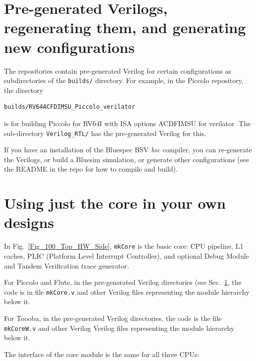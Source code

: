 \documentclass[11pt]{book}
\newcommand{\cf}{\footnotesize\tt}
\begin{document}

\section{Pre-generated Verilogs, regenerating them, and generating new configurations}

\label{sec_pre_gen_Verilog}

The repositories contain pre-generated Verilog for certain
configurations as subdirectories of the {\cf builds/} directory.  For
example, in the Piccolo repository, the directory
\begin{Verbatim}[frame=single]
    builds/RV64ACFDIMSU_Piccolo_verilator
\end{Verbatim}
is for building Piccolo for RV64I with ISA options ACDFIMSU for
verilator.  The sub-directory {\cf Verilog\_RTL/} has the
pre-generated Verilog for this.

If you have an installation of the Bluespec BSV \emph{bsc} compiler,
you can re-generate the Verilogs, or build a Bluesim simulation, or
generate other configurations (see the README in the repo for how to
compile and build).


\section{Using just the core in your own designs}

\label{sec_mkCore}

In Fig.~\ref{Fig_100_Top_HW_Side}, {\cf mkCore} is the basic core: CPU
pipeline, L1 caches, PLIC (Platform Level Interrupt Controller), and
optional Debug Module and Tandem Verification trace generator.

For Piccolo and Flute, in the pre-generated Verilog directories (see
Sec.~\ref{sec_pre_gen_Verilog}, the code is in file {\cf mkCore.v} and
other Verilog files representing the module hierarchy below it.

For Toooba, in the pre-generated Verilog directories, the code is the
file {\cf mkCoreW.v} and other Verilog Verilog files representing the
module hierarchy below it.

The interface of the core module is the same for all three CPUs:
\end{document}
